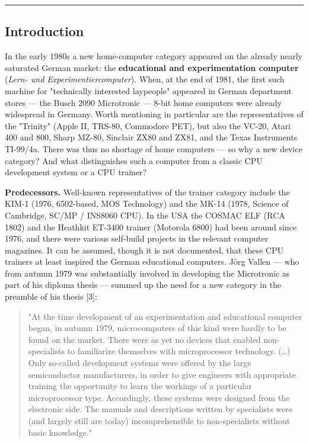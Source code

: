 \documentclass[
  11pt,
  letterpaper,
]{article}
\begin{document}
\begin{center}\rule{0.5\linewidth}{0.5pt}\end{center}

\subsection{Introduction}\label{introduction}

In the early 1980s a new home-computer category appeared on the already
nearly saturated German market: the \textbf{educational and
experimentation computer} (\emph{Lern- und Experimentiercomputer}).
When, at the end of 1981, the first such machine for "technically
interested laypeople" appeared in German department stores --- the Busch
2090 Microtronic --- 8-bit home computers were already widespread in
Germany. Worth mentioning in particular are the representatives of the
"Trinity" (Apple II, TRS-80, Commodore PET), but also the VC-20, Atari
400 and 800, Sharp MZ-80, Sinclair ZX80 and ZX81, and the Texas
Instruments TI-99/4a. There was thus no shortage of home computers ---
so why a new device category? And what distinguishes such a computer
from a classic CPU development system or a CPU trainer?

\textbf{Predecessors.} Well-known representatives of the trainer
category include the KIM-1 (1976, 6502-based, MOS Technology) and the
MK-14 (1978, Science of Cambridge, SC/MP / INS8060 CPU). In the USA the
COSMAC ELF (RCA 1802) and the Heathkit ET-3400 trainer (Motorola 6800)
had been around since 1976, and there were various self-build projects
in the relevant computer magazines. It can be assumed, though it is not
documented, that these CPU trainers at least inspired the German
educational computers. Jörg Vallen --- who from autumn 1979 was
substantially involved in developing the Microtronic as part of his
diploma thesis --- summed up the need for a new category in the preamble
of his thesis {[}3{]}:

\begin{quote}
"At the time development of an experimentation and educational computer
began, in autumn 1979, microcomputers of this kind were hardly to be
found on the market. There were as yet no devices that enabled
non-specialists to familiarize themselves with microprocessor
technology. (\ldots) Only so-called development systems were offered by
the large semiconductor manufacturers, in order to give engineers with
appropriate training the opportunity to learn the workings of a
particular microprocessor type. Accordingly, these systems were designed
from the electronic side. The manuals and descriptions written by
specialists were (and largely still are today) incomprehensible to
non-specialists without basic knowledge."
\end{quote}
\end{document}
